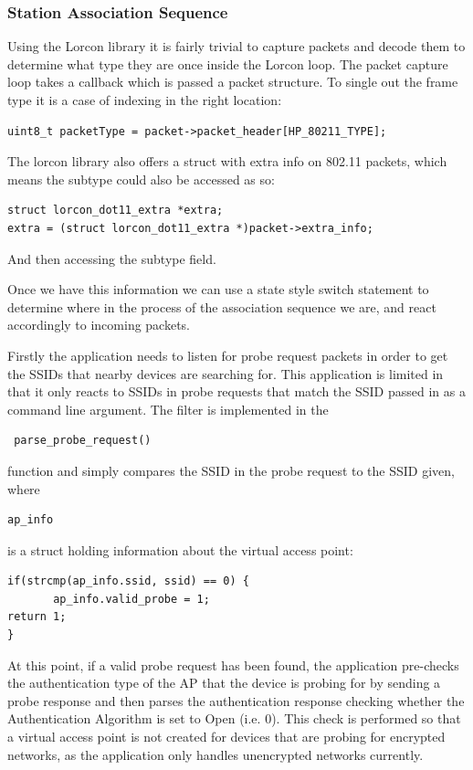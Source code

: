 \subsubsection{Station Association Sequence}
Using the Lorcon library it is fairly trivial to capture packets and decode them to determine what type they are once inside the Lorcon loop. The packet capture loop takes a callback which is passed a packet structure. To single out the frame type it is a case of indexing in the right location:

\begin{verbatim}
uint8_t packetType = packet->packet_header[HP_80211_TYPE];
\end{verbatim}
The lorcon library also offers a struct with extra info on 802.11 packets, which means the subtype could also be accessed as so:
\begin{verbatim}
struct lorcon_dot11_extra *extra;
extra = (struct lorcon_dot11_extra *)packet->extra_info;
\end{verbatim}
And then accessing the subtype field.

Once we have this information we can use a state style switch statement to determine where in the process of the association sequence we are, and react accordingly to incoming packets.

Firstly the application needs to listen for probe request packets in order to get the SSIDs that nearby devices are searching for. This application is limited in that it only reacts to SSIDs in probe requests that match the SSID passed in as a command line argument. The filter is implemented in the\begin{verbatim} parse_probe_request() \end{verbatim}function and simply compares the SSID in the probe request to the SSID given, where \begin{verbatim}ap_info\end{verbatim} is a struct holding information about the virtual access point:
\begin{verbatim}
if(strcmp(ap_info.ssid, ssid) == 0) {
       ap_info.valid_probe = 1;
return 1;
}
\end{verbatim}
At this point, if a valid probe request has been found, the application pre-checks the authentication type of the AP that the device is probing for by sending a probe response and then parses the authentication response checking whether the Authentication Algorithm is set to Open (i.e. 0). This check is performed so that a virtual access point is not created for devices that are probing for encrypted networks, as the application only handles unencrypted networks currently.

